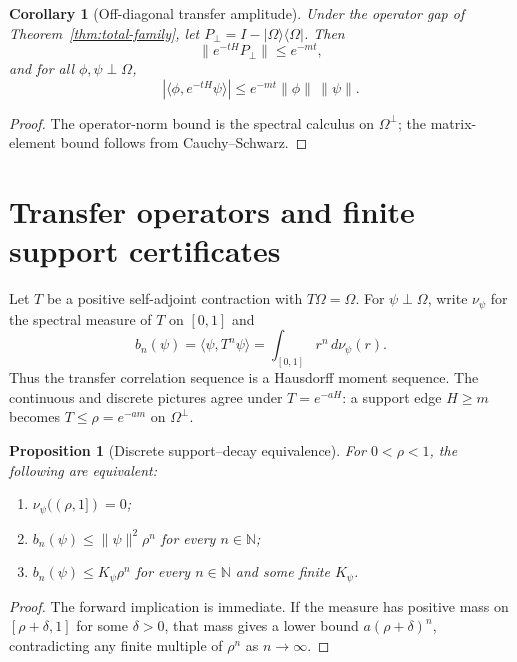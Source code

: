 \documentclass[11pt,a4paper]{article}
\newtheorem{proposition}[theorem]{Proposition}
\newtheorem{corollary}[theorem]{Corollary}
\theoremstyle{definition}
\theoremstyle{remark}
\newcommand{\N}{\mathbb N}
\begin{document}
\begin{corollary}[Off-diagonal transfer amplitude]
\label{cor:offdiagonal}
Under the operator gap of Theorem~\ref{thm:total-family}, let
$P_\perp=I-|\Omega\rangle\langle\Omega|$.  Then
\[
  \|e^{-tH}P_\perp\|\leq e^{-mt},
\]
and for all $\phi,\psi\perp\Omega$,
\[
  |\langle\phi,e^{-tH}\psi\rangle|
  \leq e^{-mt}\|\phi\|\,\|\psi\|.
  \label{eq:offdiagonal}
\]
\end{corollary}

\begin{proof}
The operator-norm bound is the spectral calculus on $\Omega^\perp$; the
matrix-element bound follows from Cauchy--Schwarz.
\end{proof}

\section{Transfer operators and finite support certificates}
\label{sec:transfer}

Let $T$ be a positive self-adjoint contraction with $T\Omega=\Omega$.  For
$\psi\perp\Omega$, write $\nu_\psi$ for the spectral measure of $T$ on
$[0,1]$ and
\[
  b_n(\psi)=\langle\psi,T^n\psi\rangle
  =\int_{[0,1]}r^n\,d\nu_\psi(r).
  \label{eq:transfer-moments}
\]
Thus the transfer correlation sequence is a Hausdorff moment sequence.  The
continuous and discrete pictures agree under $T=e^{-aH}$: a support edge
$H\geq m$ becomes $T\leq\rho=e^{-am}$ on $\Omega^\perp$.

\begin{proposition}[Discrete support--decay equivalence]
\label{prop:discrete-support}
For $0<\rho<1$, the following are equivalent:
\begin{enumerate}
  \item $\nu_\psi((\rho,1])=0$;
  \item $b_n(\psi)\leq\|\psi\|^2\rho^n$ for every $n\in\N$;
  \item $b_n(\psi)\leq K_\psi\rho^n$ for every $n\in\N$ and some finite
  $K_\psi$.
\end{enumerate}
\end{proposition}

\begin{proof}
The forward implication is immediate.  If the measure has positive mass on
$[\rho+\delta,1]$ for some $\delta>0$, that mass gives a lower bound
$a(\rho+\delta)^n$, contradicting any finite multiple of $\rho^n$ as
$n\to\infty$.
\end{proof}
\end{document}
